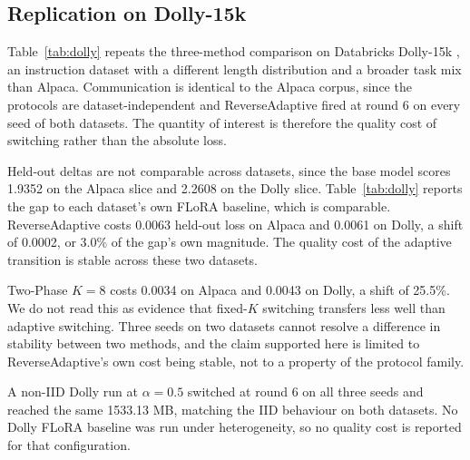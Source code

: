 \subsection{Replication on Dolly-15k}
\label{sec:dolly}
Table~\ref{tab:dolly} repeats the three-method comparison on Databricks Dolly-15k \citep{dolly2023}, an instruction dataset with a different length distribution and a broader task mix than Alpaca. Communication is identical to the Alpaca corpus, since the protocols are dataset-independent and ReverseAdaptive fired at round 6 on every seed of both datasets. The quantity of interest is therefore the quality cost of switching rather than the absolute loss.

Held-out deltas are not comparable across datasets, since the base model scores 1.9352 on the Alpaca slice and 2.2608 on the Dolly slice. Table~\ref{tab:dolly} reports the gap to each dataset's own FLoRA baseline, which is comparable. ReverseAdaptive costs 0.0063 held-out loss on Alpaca and 0.0061 on Dolly, a shift of 0.0002, or 3.0\% of the gap's own magnitude. The quality cost of the adaptive transition is stable across these two datasets.

Two-Phase $K{=}8$ costs 0.0034 on Alpaca and 0.0043 on Dolly, a shift of 25.5\%. We do not read this as evidence that fixed-$K$ switching transfers less well than adaptive switching. Three seeds on two datasets cannot resolve a difference in stability between two methods, and the claim supported here is limited to ReverseAdaptive's own cost being stable, not to a property of the protocol family.

A non-IID Dolly run at $\alpha{=}0.5$ switched at round 6 on all three seeds and reached the same 1533.13 MB, matching the IID behaviour on both datasets. No Dolly FLoRA baseline was run under heterogeneity, so no quality cost is reported for that configuration.

